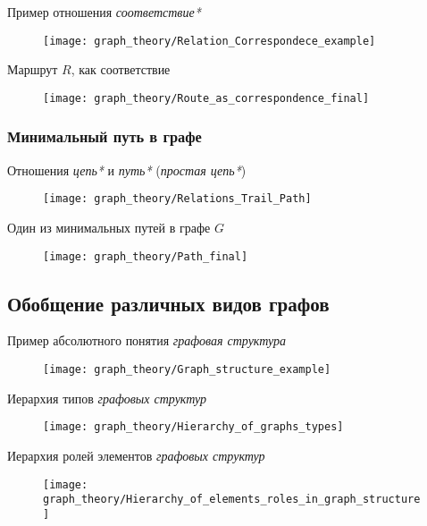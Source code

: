 \begin{frame}{Пример отношения \textit{соответствие*}}
  \begin{figure}
    \centering
    \texttt{[image: graph\_theory/Relation\_Correspondece\_example]}
  \end{figure}
\end{frame}

\begin{frame}{Маршрут $R$, как соответствие}
  \begin{figure}
    \centering
    \texttt{[image: graph\_theory/Route\_as\_correspondence\_final]}
  \end{figure}
\end{frame}

\subsubsection{Минимальный путь в графе}

\begin{frame}{Отношения \textit{цепь*} и \textit{путь*} (\textit{простая цепь*})}
  \begin{figure}
    \centering
    \texttt{[image: graph\_theory/Relations\_Trail\_Path]}
  \end{figure}
\end{frame}

\begin{frame}{Один из минимальных путей в графе $G$}
  \begin{figure}
    \centering
    \texttt{[image: graph\_theory/Path\_final]}
  \end{figure}
\end{frame}

\subsection{Обобщение различных видов графов}

\begin{frame}{Пример абсолютного понятия \textit{графовая структура}}
  \begin{figure}
    \centering
    \texttt{[image: graph\_theory/Graph\_structure\_example]}
  \end{figure}
\end{frame}

\begin{frame}{Иерархия типов \textit{графовых структур}}
  \begin{figure}
    \centering
    \texttt{[image: graph\_theory/Hierarchy\_of\_graphs\_types]}
  \end{figure}
\end{frame}

\begin{frame}{Иерархия ролей элементов \textit{графовых структур}}
  \begin{figure}
    \centering
    \texttt{[image: graph\_theory/Hierarchy\_of\_elements\_roles\_in\_graph\_structure]}
  \end{figure}
\end{frame}

